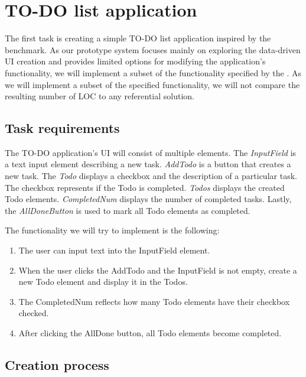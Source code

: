 \section{TO-DO list application}
The first task is creating a simple TO-DO list application inspired by the \citet{TodoMVC} benchmark.
As our prototype system focuses mainly on exploring the data-driven UI creation and provides limited options for modifying the application's functionality,
we will implement a subset of the functionality specified by the \citet{todo-spec}.
As we will implement a subset of the specified functionality, we will not compare the resulting number of LOC to any referential solution.

\subsection{Task requirements}

The TO-DO application's UI will consist of multiple elements.
The \emph{InputField} is a text input element describing a new task.
\emph{AddTodo} is a button that creates a new task.
The \emph{Todo} displays a checkbox and the description of a particular task. The checkbox represents if the Todo is completed.
\emph{Todos} displays the created Todo elements.
\emph{CompletedNum} displays the number of completed tasks.
Lastly, the \emph{AllDoneButton} is used to mark all Todo elements as completed.

The functionality we will try to implement is the following:
\begin{enumerate}
	\item The user can input text into the InputField element.
	\item When the user clicks the AddTodo and the InputField is not empty, create a new Todo element and display it in the Todos.
	\item The CompletedNum reflects how many Todo elements have their checkbox checked.
	\item After clicking the AllDone button, all Todo elements become completed.
\end{enumerate}
\medskip
\subsection{Creation process}

